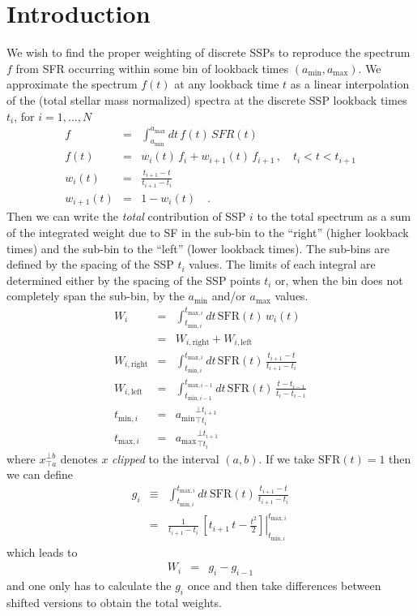 \documentclass[12pt, letterpaper, preprint]{aastex}
\newcommand{\tmin}[1][]{t_{\mathrm{min} #1}}
\newcommand{\tmax}[1][]{t_{\mathrm{max} #1}}
\newcommand{\amin}{a_{\mathrm{min}}}
\newcommand{\amax} {a_{\mathrm{max}}}
\newcommand{\tintegral}{\int_{\tmin[,i]}^{\tmax[,i]} dt}
\newcommand{\tinterval}{\right|_{\tmin[,i]}^{\tmax[,i]}}
\newcommand{\clip}[3][]{{#1}_{\top {#2}}^{\bot {#3}}}
\begin{document}
\author{B. Johnson}


\section{Introduction}
We wish to find the proper weighting of discrete SSPs to reproduce the spectrum $f$ from SFR occurring within some bin of  lookback times $(\amin, \amax)$.
We approximate the spectrum $f(t)$ at any lookback time $t$ as a linear interpolation of the (total stellar mass normalized) spectra at the discrete SSP lookback times $t_i$, for $i=1,...,N$ 
\begin{eqnarray}
f & = & \int_{\amin}^{\amax} dt \, f(t) \, SFR(t) \nonumber \\
f(t) & = & w_{i}(t) \, f_i + w_{i+1}(t) \, f_{i+1} \, , \quad t_i < t < t_{i+1}  \nonumber \\
w_{i}(t) & = & \frac{t_{i+1} - t}{t_{i+1}  - t_i} \nonumber \\
w_{i+1}(t) & = & 1 - w_i(t) \quad . \nonumber
\end{eqnarray}
Then we can write the \emph{total} contribution of SSP $i$ to the total spectrum as a sum of the integrated weight due to SF in the sub-bin to the ``right'' (higher lookback times) and the  sub-bin to the ``left'' (lower lookback times).
The sub-bins are defined by the spacing of the SSP $t_i$ values. 
The limits of each integral are determined either by the spacing of the SSP points $t_i$ or, when the bin does not completely span the sub-bin, by the $\amin$ and/or $\amax$ values.
\begin{eqnarray}
W_i & = &  \tintegral \, \mathrm{SFR}(t) \, w_i(t) \nonumber \\
 & = & W_{i, \mathrm{right}} + W_{i, \mathrm{left}} \nonumber \\
W_{i, \mathrm{right}} & = & \tintegral \, \mathrm{SFR}(t) \, \frac{t_{i+1} - t}{t_{i+1}  - t_i} \nonumber \\
W_{i, \mathrm{left}} & = & \int_{\tmin[,i-1]}^{\tmax[,i-1]} dt \, \mathrm{SFR}(t) \, \frac{t - t_{i-1}}{t_{i}  - t_{i-1}} \nonumber \\
\tmin[,i] & = & \clip[\amin]{t_i}{t_{i+1}} \nonumber \\
\tmax[,i] & = & \clip[\amax]{t_i}{t_{i+1}} \nonumber
\end{eqnarray}
where $\clip[x]{a}{b}$ denotes $x$ \emph{clipped} to the interval $(a,b)$. If we take $\mathrm{SFR}(t) = 1$ then we can define
\begin{eqnarray}
g_i & \equiv & \tintegral \, \mathrm{SFR}(t) \, \frac{t_{i+1} - t}{t_{i+1}  - t_i} \nonumber  \\
 & = & \left. \frac{1}{t_{i+1} - t_i} \, \left[ t_{i+1} \, t - \frac{t^2}{2} \right] \tinterval
\end{eqnarray}
which leads to
\begin{eqnarray}
W_i & = & g_{i} - g_{i-1}
\end{eqnarray}
and one only has to calculate the ${g_i}$ once and then take differences between shifted versions to obtain the total weights.
\end{document}
